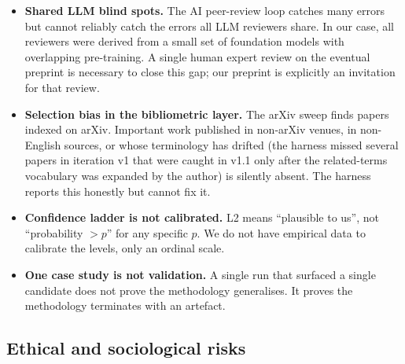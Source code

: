 \documentclass[11pt]{article}
\theoremstyle{definition}
\theoremstyle{remark}
\begin{document}
\begin{itemize}
\item \textbf{Shared LLM blind spots.} The AI peer-review loop catches
many errors but cannot reliably catch the errors all LLM reviewers share.
In our case, all reviewers were derived from a small set of foundation
models with overlapping pre-training. A single human expert review on
the eventual preprint is necessary to close this gap; our preprint is
explicitly an invitation for that review.
\item \textbf{Selection bias in the bibliometric layer.} The arXiv
sweep finds papers indexed on arXiv. Important work published in
non-arXiv venues, in non-English sources, or whose terminology has
drifted (the harness missed several papers in iteration v1 that were
caught in v1.1 only after the related-terms vocabulary was expanded by
the author) is silently absent. The harness reports this honestly but
cannot fix it.
\item \textbf{Confidence ladder is not calibrated.} L2 means
``plausible to us'', not ``probability $> p$'' for any specific
$p$. We do not have empirical data to calibrate the levels, only an
ordinal scale.
\item \textbf{One case study is not validation.} A single run that
surfaced a single candidate does not prove the methodology generalises.
It proves the methodology terminates with an artefact.
\end{itemize}

\subsection{Ethical and sociological risks}\label{sec:ethics}
\end{document}
